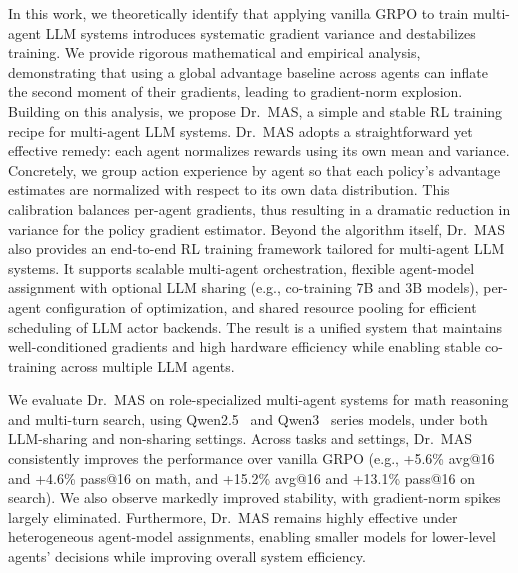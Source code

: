 \documentclass[]{fairmeta}
\theoremstyle{plain}
\theoremstyle{definition}
\theoremstyle{remark}
\newcommand{\methodname}{Dr.\ MAS}
\begin{document}
In this work, we theoretically identify that applying vanilla GRPO to train multi-agent LLM systems introduces systematic gradient variance and destabilizes training. We provide rigorous mathematical and empirical analysis, demonstrating that using a global advantage baseline across agents can inflate the second moment of their gradients, leading to gradient-norm explosion. 
Building on this analysis, we propose \methodname{}, a simple and stable RL training recipe for multi-agent LLM systems. \methodname{} adopts a straightforward yet effective remedy: each agent normalizes rewards using its own mean and variance. Concretely, we group action experience by agent so that each policy’s advantage estimates are normalized with respect to its own data distribution.
This calibration balances per-agent gradients, thus resulting in a dramatic reduction in variance for the policy gradient estimator. Beyond the algorithm itself, \methodname{} also provides an end-to-end RL training framework tailored for multi-agent LLM systems. It supports scalable multi-agent orchestration, flexible agent-model assignment with optional LLM sharing (e.g., co-training 7B and 3B models), per-agent configuration of optimization, and shared resource pooling for efficient scheduling of LLM actor backends. The result is a unified system that maintains well-conditioned gradients and high hardware efficiency while enabling stable co-training across multiple LLM agents.

We evaluate \methodname{} on role-specialized multi-agent systems for math reasoning and multi-turn search, using Qwen2.5~\citep{bai2025qwen2} and Qwen3~\citep{yang2025qwen3} series models, under both LLM-sharing and non-sharing settings. Across tasks and settings, \methodname{} consistently improves the performance over vanilla GRPO (e.g., +5.6\% avg@16 and +4.6\% pass@16 on math, and +15.2\% avg@16 and +13.1\% pass@16 on search). We also observe markedly improved stability, with gradient-norm spikes largely eliminated. Furthermore, \methodname{} remains highly effective under heterogeneous agent-model assignments, enabling smaller models for lower-level agents' decisions while improving overall system efficiency. 



\end{document}
